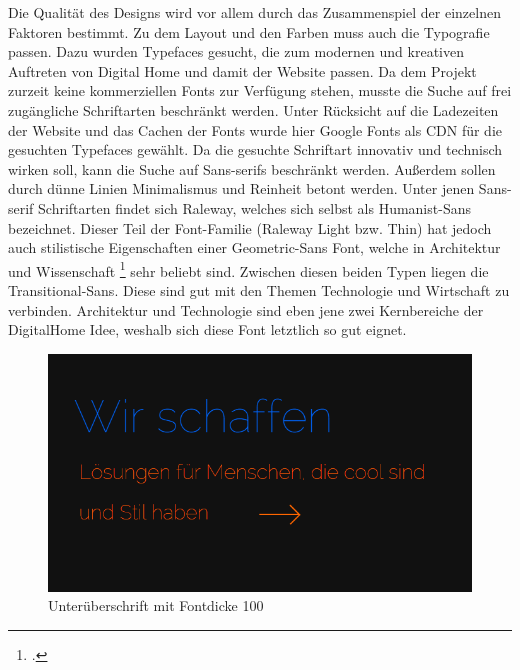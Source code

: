 Die Qualität des Designs wird vor allem durch das Zusammenspiel der einzelnen Faktoren bestimmt. Zu dem Layout und den Farben muss auch die Typografie passen. Dazu wurden Typefaces gesucht, die zum modernen und kreativen Auftreten von Digital Home und damit der Website passen. Da dem Projekt zurzeit keine kommerziellen Fonts zur Verfügung stehen, musste die Suche auf frei zugängliche Schriftarten beschränkt werden. Unter Rücksicht auf die Ladezeiten der Website und das Cachen der Fonts wurde hier Google Fonts als CDN für die gesuchten Typefaces gewählt.
Da die gesuchte Schriftart innovativ und technisch wirken soll, kann die Suche auf Sans-serifs beschränkt werden. Außerdem sollen durch dünne Linien Minimalismus und Reinheit betont werden. Unter jenen Sans-serif Schriftarten findet sich Raleway, welches sich selbst als Humanist-Sans bezeichnet. Dieser Teil der Font-Familie (Raleway Light bzw. Thin) hat jedoch auch stilistische Eigenschaften einer Geometric-Sans Font, welche in Architektur und Wissenschaft \footcite[vgl.][]{codeschool:typo} sehr beliebt sind. Zwischen diesen beiden Typen liegen die Transitional-Sans. Diese sind gut mit den Themen Technologie und Wirtschaft zu verbinden. Architektur und Technologie sind eben jene zwei Kernbereiche der DigitalHome Idee, weshalb sich diese Font letztlich so gut eignet.
        \begin{figure} [htp]
\includegraphics[width=\textwidth]{./img/inno_typo1.png}
\caption{Unterüberschrift mit Fontdicke 100}
\label{inno_Typo1}
\end{figure}

